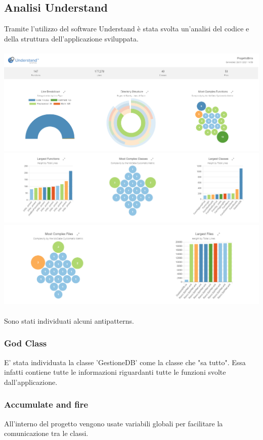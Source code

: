 \documentclass[a4paper, titlepage]{article}
\begin{document}
\subsection{Analisi Understand}
Tramite l'utilizzo del software Understand è stata svolta un'analisi del codice e della struttura dell'applicazione sviluppata.\\\\
\includegraphics[scale=0.40]{Immagini/Understand_1.png}\\
\includegraphics[scale=0.40]{Immagini/Understand_3.png}\\
\includegraphics[scale=0.40]{Immagini/Understand_2.png}\\
\\Sono stati individuati alcuni antipatterns.
\subsubsection{God Class}
E' stata individuata la classe 'GestioneDB' come la classe che "sa tutto". Essa infatti contiene tutte le informazioni riguardanti tutte le funzioni svolte dall'applicazione.
\subsubsection{Accumulate and fire}
All'interno del progetto vengono usate variabili globali per facilitare la comunicazione tra le classi.
\end{document}
